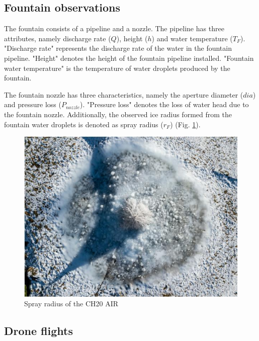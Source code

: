 \subsection{Fountain observations}

The fountain consists of a pipeline and a nozzle. The pipeline has three attributes, namely discharge rate
($Q$), height ($h$) and water temperature ($T_F$). "Discharge rate" represents the discharge rate of the water in
the fountain pipeline. "Height" denotes the height of the fountain pipeline installed. "Fountain water temperature"
is the temperature of water droplets produced by the fountain.

The fountain nozzle has three characteristics, namely the aperture diameter ($dia$) and pressure loss
($P_{nozzle}$). "Pressure loss" denotes the loss of water head due to the fountain nozzle. Additionally,
the observed ice radius formed from the fountain water droplets is denoted as spray radius ($r_F$) (Fig.
\ref{fig:CH20_rad}).

\begin{figure}[htb]
	\centering
	\includegraphics[width=\textwidth/2]{figs/CH20_sprayrad.jpg}
	\caption{Spray radius of the CH20 AIR }
	\label{fig:CH20_rad}
\end{figure}

\subsection{Drone flights}

